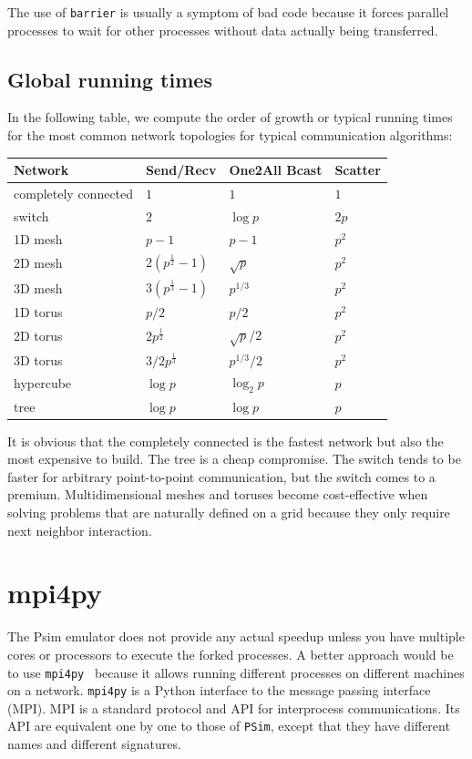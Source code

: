 \documentclass[justified, sixbynine]{tufte-book}
\def\ft{\small\tt}
\theoremstyle{plain}%
\newtheorem * {corollary}{Corollary}
\theoremstyle{definition}
\theoremstyle{remark}
\newtheorem * {remark}{Remark}
\newtheorem * {note}{Note}
\begin{document}
\begin{fullwidth}
The use of {\ft barrier} is usually a symptom of bad code because it forces parallel processes to wait for other processes without data actually being transferred.

\goodbreak\subsection{Global running times}

In the following table, we compute the order of growth or typical running times for the most common network topologies for typical communication algorithms:

\begin{tabular}{|l|lll|} \hline
Network & Send/Recv & One2All Bcast & Scatter \\ \hline
completely connected & $1$ & $1$ & $1$ \\
switch  & $2$ & $\log p$ & $2p$ \\
1D mesh  & $p-1$ & $p-1$ & $p^2$ \\
2D mesh  & $2(p^{\frac12}-1)$ & $\sqrt{p}$ & $p^2$ \\
3D mesh  & $3(p^{\frac13}-1)$ & $p^{1/3}$ & $p^2$ \\
1D torus  & $p/2$ & $p/2$ & $p^2$ \\
2D torus  & $2p^{\frac12}$ & $\sqrt{p}/2$ & $p^2$ \\
3D torus  & $3/2 p^{\frac13}$ & $p^{1/3}/2$ & $p^2$ \\
hypercube  & $\log p$ & $\log_2 p$ & $p$ \\
tree  & $\log p$ & $\log p$ & $p$
\\ \hline
\end{tabular}

It is obvious that the completely connected is the fastest network but also the most expensive to build. The tree is a cheap compromise. The switch tends to be faster for arbitrary point-to-point communication, but the switch comes to a premium. Multidimensional meshes and toruses become cost-effective when solving problems that are naturally defined on a grid because they only require next neighbor interaction.

\goodbreak\section{mpi4py}

The Psim emulator does not provide any actual speedup unless you have multiple cores or processors to execute the forked processes. A better approach would be to use {\ft mpi4py}~\cite{mpi4py} because it allows running different processes on different machines on a network. {\ft mpi4py} is a Python interface to the message passing interface (MPI). MPI is a standard protocol and API for interprocess communications. Its API are equivalent one by one to those of {\ft PSim}, except that they have different names and different signatures.


\end{fullwidth}
\end{document}
